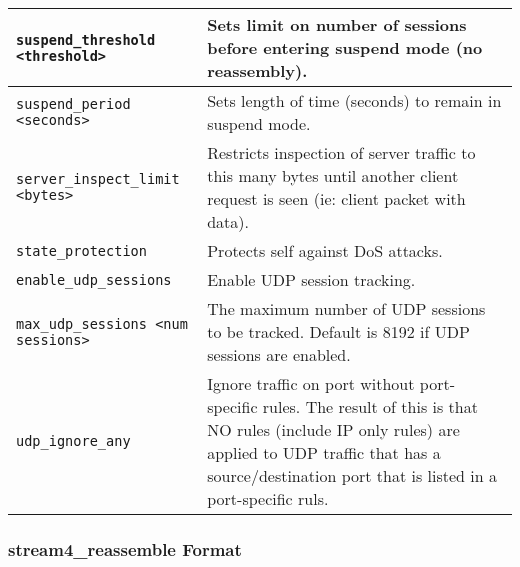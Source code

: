 \documentclass[english]{report}
\begin{document}
\begin{tabular}{| l | p{3.5in} |}
\hline
\texttt{suspend\_threshold <threshold>} & Sets limit on number of sessions before entering suspend mode (no reassembly).\\
\hline
\texttt{suspend\_period <seconds>} & Sets length of time (seconds) to remain in suspend mode.\\
\hline
\texttt{server\_inspect\_limit <bytes>} & Restricts inspection of server traffic to this many bytes until another client request is seen (ie: client packet with data).\\
\hline
\texttt{state\_protection} & Protects self against DoS attacks.\\
\hline
\texttt{enable\_udp\_sessions} & Enable UDP session tracking.\\
\hline
\texttt{max\_udp\_sessions <num sessions>} & The maximum number of UDP sessions to be tracked. Default is 8192 if UDP sessions are enabled.\\
\hline
\texttt{udp\_ignore\_any} & Ignore traffic on port without port-specific rules.  The result of this is that NO rules (include IP only rules) are applied to UDP traffic that has a source/destination port that is listed in a port-specific ruls.\\
\hline
\end{tabular}

\subsubsection{stream4\_reassemble Format}
\end{document}
